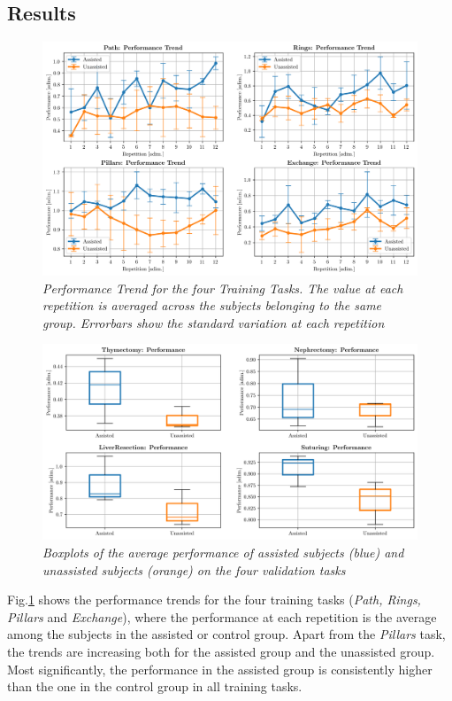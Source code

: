 \documentclass{article}
\begin{document}
\begin{multicols}{2}
\section{Results}
\begin{figure}
  \centering
      \includegraphics[width=\linewidth]{images/performance_training.png}
      \caption{\small{\textit{
        Performance Trend for the four Training Tasks. The value at each repetition is averaged across the subjects belonging to the same group. Errorbars show the standard variation at each repetition
      }}}
      \label{fig:performancetraining}
\end{figure}
\begin{figure}
  \centering
      \includegraphics[width=\linewidth]{images/performance_validation.png}
      \caption{\small{\textit{
        Boxplots of the average performance of assisted subjects (blue) and unassisted subjects (orange) on the four validation tasks
      }}}
      \label{fig:performancevalidation}
\end{figure}

Fig.\ref{fig:performancetraining} shows the performance trends for the four training tasks (\textit{Path, Rings, Pillars} and \textit{Exchange}), where the performance at each repetition is the average among the subjects in the assisted or control group. Apart from the \textit{Pillars} task, the trends are increasing both for the assisted group and the unassisted group. Most significantly, the performance in the assisted group is consistently higher than the one in the control group in all training tasks. 


\end{multicols}
\end{document}
